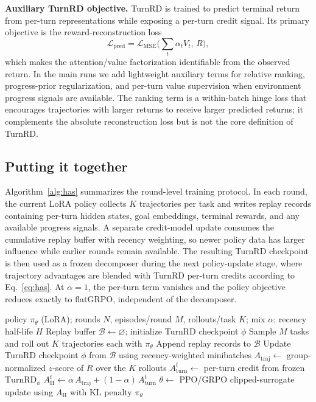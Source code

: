 \documentclass{article}
\newcommand{\Atraj}{A_{\text{traj}}}
\newcommand{\Aturn}{A_{\text{turn}}}
\newcommand{\AH}{A_{\text{H}}}
\begin{document}
\textbf{Auxiliary TurnRD objective.} TurnRD is trained to predict terminal return from
per-turn representations while exposing a per-turn credit signal. Its primary objective is the
reward-reconstruction loss
\begin{equation}
\mathcal{L}_{\text{pred}}
=
\mathcal{L}_{\text{MSE}}\!\Big(\textstyle\sum_t \alpha_t V_t,\,R\Big),
\label{eq:loss}
\end{equation}
which makes the attention/value factorization identifiable from the observed return. In the
main runs we add lightweight auxiliary terms for relative ranking, progress-prior regularization,
and per-turn value supervision when environment progress signals are available. The ranking
term is a within-batch hinge loss that encourages trajectories with larger returns to receive
larger predicted returns; it complements the absolute reconstruction loss but is not the core
definition of TurnRD.

\subsection{Putting it together}
Algorithm~\ref{alg:has} summarizes the round-level training protocol. In each round, the
current LoRA policy collects $K$ trajectories per task and writes replay records containing
per-turn hidden states, goal embeddings, terminal rewards, and any available progress signals.
A separate credit-model update consumes the cumulative replay buffer with recency weighting, so
newer policy data has larger influence while earlier rounds remain available. The resulting
TurnRD checkpoint is then used as a frozen decomposer during the next policy-update stage,
where trajectory advantages are blended with TurnRD per-turn credits according to
Eq.~\eqref{eq:has}. At $\alpha{=}1$, the per-turn term vanishes and the policy objective
reduces exactly to flatGRPO, independent of the decomposer.

\begin{algorithm}[t]
\caption{Hybrid Advantage Shaping (HAS) with a replay-trained TurnRD credit model}
\label{alg:has}
\begin{algorithmic}[1]
\Require policy $\pi_\theta$ (LoRA); rounds $N$, episodes/round $M$, rollouts/task $K$;
         mix $\alpha$; recency half-life $H$
\State Replay buffer $\mathcal{B} \gets \varnothing$; initialize TurnRD checkpoint $\phi$
  \State Sample $M$ tasks and roll out $K$ trajectories each with $\pi_\theta$
  \State Append replay records to $\mathcal{B}$ 
  \State Update TurnRD checkpoint $\phi$ from $\mathcal{B}$ using recency-weighted minibatches
    \State $\Atraj \gets$ group-normalized $z$-score of $R$ over the $K$ rollouts
    \State $\Aturn^{t} \gets$ per-turn credit from frozen $\mathrm{TurnRD}_\phi$
    \State $\AH^{t} \gets \alpha\,\Atraj + (1-\alpha)\,\Aturn^{t}$ 
  \EndFor
  \State $\theta \gets$ PPO/GRPO clipped-surrogate update using $\AH$ with KL penalty
\EndFor
\State \Return $\pi_\theta$
\end{algorithmic}
\end{algorithm}
\end{document}
